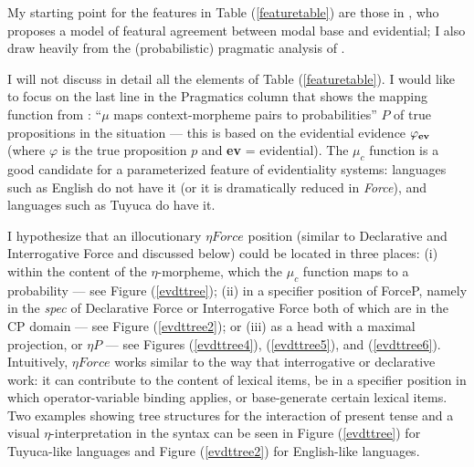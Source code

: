 \documentclass[11pt]{article}
\begin{document}
My starting point for the features in Table (\ref{featuretable}) are those in \cite{speas04evdparadigms,speas07evdfunctional}, who proposes a model of featural agreement between modal base and evidential; I also draw heavily from the (probabilistic) pragmatic analysis of \cite{davispottsspeas07pragevd}.

I will not discuss in detail all the elements of Table (\ref{featuretable}). I would like to focus on the last line in the {\sc Pragmatics} column that shows the mapping function from : ``$\mu$ maps context-morpheme pairs to probabilities'' $P$ of true propositions in the situation --- this is based on the evidential evidence $\varphi_{{\bf ev}}$ (where $\varphi$ is the true proposition $p$ and \textbf{ev} = evidential). The $\mu_{c}$ function is a good candidate for a parameterized feature of evidentiality systems: languages such as English do not have it (or it is dramatically reduced in {\sl Force}), and languages such as Tuyuca do have it. 

I hypothesize that an illocutionary $\eta Force$ position (similar to Declarative and Interrogative Force and discussed below) could be located in three places: (i) within the content of the $\eta$-morpheme, which the $\mu_{c}$ function maps to a probability --- see Figure (\ref{evdttree}); (ii) in a specifier position of ForceP, namely in the {\sl spec} of Declarative Force or Interrogative Force both of which are in the CP domain --- see Figure (\ref{evdttree2}); or (iii) as a head with a maximal projection, \mbar{$\eta$} or $\eta P$ --- see Figures (\ref{evdttree4}), (\ref{evdttree5}), and (\ref{evdttree6}). Intuitively, $\eta Force$ works similar to the way that interrogative or declarative work: it can contribute to the content of lexical items, be in a specifier position in which operator-variable binding applies, or base-generate certain lexical items. Two examples showing tree structures for the interaction of present tense and a visual $\eta$-interpretation in the syntax can be seen in Figure (\ref{evdttree}) for Tuyuca-like languages and Figure (\ref{evdttree2}) for English-like languages.
\end{document}
